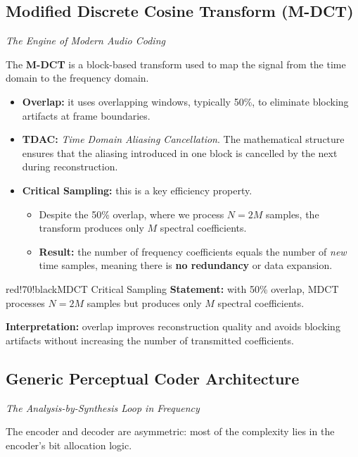 \subsection{Modified Discrete Cosine Transform (M-DCT)}

\textit{The Engine of Modern Audio Coding}

The \textbf{M-DCT} is a block-based transform used to map the signal from the time domain to the frequency domain.

\begin{itemize}
\item \textbf{Overlap:} it uses overlapping windows, typically 50\%, to eliminate blocking artifacts at frame boundaries.
\item \textbf{TDAC:} \textit{Time Domain Aliasing Cancellation}. The mathematical structure ensures that the aliasing introduced in one block is cancelled by the next during reconstruction.
\item \textbf{Critical Sampling:} this is a key efficiency property.
\begin{itemize}
\item Despite the 50\% overlap, where we process $N = 2M$ samples, the transform produces only $M$ spectral coefficients.
\item \textbf{Result:} the number of frequency coefficients equals the number of \textit{new} time samples, meaning there is \textbf{no redundancy} or data expansion.
\end{itemize}
\end{itemize}

\begin{calloutbox}{red!70!black}{MDCT Critical Sampling}
\textbf{Statement:} with 50\% overlap, MDCT processes $N = 2M$ samples but produces only $M$ spectral coefficients.

\textbf{Interpretation:} overlap improves reconstruction quality and avoids blocking artifacts without increasing the number of transmitted coefficients.
\end{calloutbox}

\subsection{Generic Perceptual Coder Architecture}

\textit{The Analysis-by-Synthesis Loop in Frequency}

The encoder and decoder are asymmetric: most of the complexity lies in the encoder's bit allocation logic.

